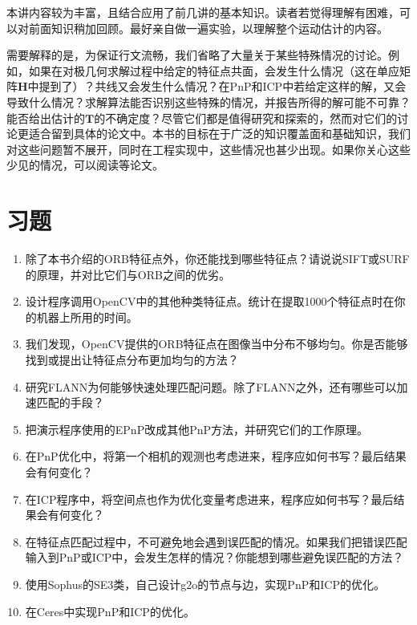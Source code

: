 本讲内容较为丰富，且结合应用了前几讲的基本知识。读者若觉得理解有困难，可以对前面知识稍加回顾。最好亲自做一遍实验，以理解整个运动估计的内容。

需要解释的是，为保证行文流畅，我们省略了大量关于某些特殊情况的讨论。例如，如果在对极几何求解过程中给定的特征点共面，会发生什么情况（这在单应矩阵$\bm{H}$中提到了）？共线又会发生什么情况？在PnP和ICP中若给定这样的解，又会导致什么情况？求解算法能否识别这些特殊的情况，并报告所得的解可能不可靠？能否给出估计的$\bm{T}$的不确定度？尽管它们都是值得研究和探索的，然而对它们的讨论更适合留到具体的论文中。本书的目标在于广泛的知识覆盖面和基础知识，我们对这些问题暂不展开，同时在工程实现中，这些情况也甚少出现。如果你关心这些少见的情况，可以阅读\cite{Hartley2003}等论文。

\section*{习题}
\begin{enumerate}
	\item 除了本书介绍的ORB特征点外，你还能找到哪些特征点？请说说SIFT或SURF的原理，并对比它们与ORB之间的优劣。
	\item 设计程序调用OpenCV中的其他种类特征点。统计在提取1000个特征点时在你的机器上所用的时间。
	\item[\optional] 我们发现，OpenCV提供的ORB特征点在图像当中分布不够均匀。你是否能够找到或提出让特征点分布更加均匀的方法？
	\item 研究FLANN为何能够快速处理匹配问题。除了FLANN之外，还有哪些可以加速匹配的手段？
	\item 把演示程序使用的EPnP改成其他PnP方法，并研究它们的工作原理。
	\item 在PnP优化中，将第一个相机的观测也考虑进来，程序应如何书写？最后结果会有何变化？
	\item 在ICP程序中，将空间点也作为优化变量考虑进来，程序应如何书写？最后结果会有何变化？
	\item[\optional] 在特征点匹配过程中，不可避免地会遇到误匹配的情况。如果我们把错误匹配输入到PnP或ICP中，会发生怎样的情况？你能想到哪些避免误匹配的方法？
	\item[\optional] 使用Sophus的SE3类，自己设计g2o的节点与边，实现PnP和ICP的优化。
	\item[\optional] 在Ceres中实现PnP和ICP的优化。
\end{enumerate}


